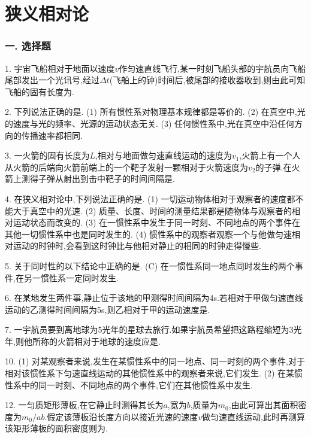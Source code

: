 \section*{狭义相对论}

\subsubsection*{一. 选择题}

1. 宇宙飞船相对于地面以速度$v$作匀速直线飞行,某一时刻飞船头部的宇航员向飞船尾部发出一个光讯号,经过$\Delta t$(飞船上的钟)时间后,被尾部的接收器收到,则由此可知飞船的固有长度为.

2. 下列说法正确的是.\pp
    (1) 所有惯性系对物理基本规律都是等价的.\pp
    (2) 在真空中,光的速度与光的频率、光源的运动状态无关.\pp
    (3) 任何惯性系中,光在真空中沿任何方向的传播速率都相同.

3. 一火箭的固有长度为$L$,相对与地面做匀速直线运动的速度为$v_1$,火箭上有一个人从火箭的后端向火箭前端上的一个靶子发射一颗相对于火箭速度为$v_2$的子弹.在火箭上测得子弹从射出到击中靶子的时间间隔是.

4. 在狭义相对论中,下列说法正确的是.\pp
    (1) 一切运动物体相对于观察者的速度都不能大于真空中的光速.\pp
    (2) 质量、长度、时间的测量结果都是随物体与观察者的相对运动状态而改变的.\pp
    (3) 在一惯性系中发生于同一时刻、不同地点的两个事件在其他一切惯性系中也是同时发生的.\pp
    (4) 惯性系中的观察者观察一个与他做匀速相对运动的时钟时,会看到这时钟比与他相对静止的相同的时钟走得慢些.

5. 关于同时性的以下结论中正确的是.\pp
    (C) 在一惯性系同一地点同时发生的两个事件,在另一惯性系一定同时发生.

6. 在某地发生两件事,静止位于该地的甲测得时间间隔为4s.若相对于甲做匀速直线运动的乙测得时间间隔为5s,则乙相对于甲的运动速度是.

7. 一宇航员要到离地球为5光年的星球去旅行.如果宇航员希望把这路程缩短为3光年,则他所称的火箭相对于地球的速度应是.

10.
    (1) 对某观察者来说,发生在某惯性系中的同一地点、同一时刻的两个事件,对于相对该惯性系下匀速直线运动的其他惯性系中的观察者来说,它们发生.
    (2) 在某惯性系中的同一时刻、不同地点的两个事件,它们在其他惯性系中发生.

12. 一匀质矩形薄板,在它静止时测得其长为$a$,宽为$b$,质量为$m_0$,由此可算出其面积密度为$m_0/ab$.假定该薄板沿长度方向以接近光速的速度$v$做匀速直线运动,此时再测算该矩形薄板的面积密度则为.

